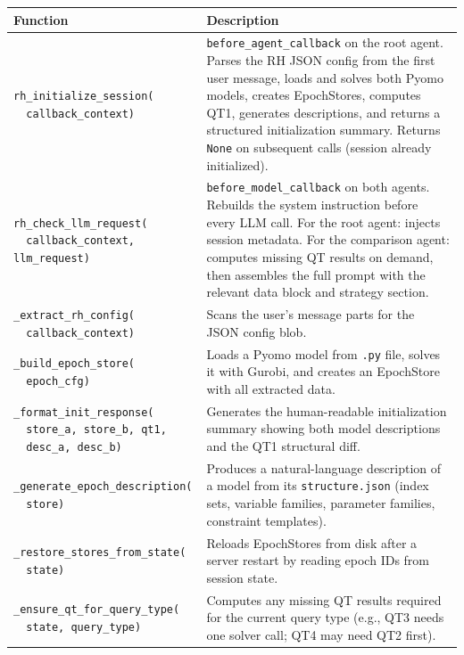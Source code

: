 \documentclass[11pt, a4paper]{article}
\begin{document}
\begin{longtable}{p{5.5cm} p{9cm}}
\toprule
\textbf{Function} & \textbf{Description} \\
\midrule
\texttt{rh\_initialize\_session(\\ ~~callback\_context)} &
    \texttt{before\_agent\_callback} on the root agent.  Parses the RH
    JSON config from the first user message, loads and solves both Pyomo
    models, creates EpochStores, computes QT1, generates descriptions,
    and returns a structured initialization summary.  Returns \texttt{None}
    on subsequent calls (session already initialized). \\
\midrule
\texttt{rh\_check\_llm\_request(\\ ~~callback\_context, llm\_request)} &
    \texttt{before\_model\_callback} on both agents.  Rebuilds the system
    instruction before every LLM call.  For the root agent: injects session
    metadata.  For the comparison agent: computes missing QT results on
    demand, then assembles the full prompt with the relevant data block
    and strategy section. \\
\midrule
\texttt{\_extract\_rh\_config(\\ ~~callback\_context)} &
    Scans the user's message parts for the JSON config blob. \\
\midrule
\texttt{\_build\_epoch\_store(\\ ~~epoch\_cfg)} &
    Loads a Pyomo model from \texttt{.py} file, solves it with Gurobi,
    and creates an EpochStore with all extracted data. \\
\midrule
\texttt{\_format\_init\_response(\\ ~~store\_a, store\_b, qt1,\\ ~~desc\_a, desc\_b)} &
    Generates the human-readable initialization summary showing both
    model descriptions and the QT1 structural diff. \\
\midrule
\texttt{\_generate\_epoch\_description(\\ ~~store)} &
    Produces a natural-language description of a model from its
    \texttt{structure.json} (index sets, variable families, parameter
    families, constraint templates). \\
\midrule
\texttt{\_restore\_stores\_from\_state(\\ ~~state)} &
    Reloads EpochStores from disk after a server restart by reading
    epoch IDs from session state. \\
\midrule
\texttt{\_ensure\_qt\_for\_query\_type(\\ ~~state, query\_type)} &
    Computes any missing QT results required for the current query type
    (e.g., QT3 needs one solver call; QT4 may need QT2 first). \\
\bottomrule
\end{longtable}
\end{document}
